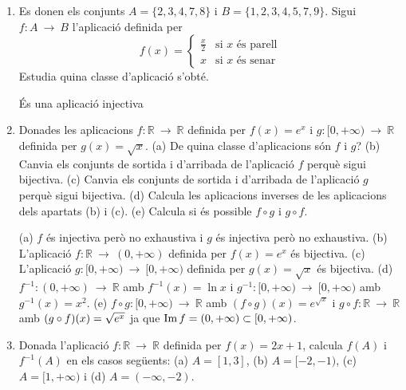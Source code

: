 \begin{enumerate}
\item
\begin{exercici}
Es donen els conjunts $A=\{2,3,4,7,8\}$ i $B=\{1,2,3,4,5,7,9\}$. Sigui
$f:A~\longrightarrow ~B$ l'aplicació definida per
\begin{equation*}
f(x)=\left\{
\begin{array}{ll}
\frac{x}{2} & \text{si \ }x\text{ \ és parell} \\
x & \text{si \ }x\text{ \ és senar}%
\end{array}%
\right.
\end{equation*}%
Estudia quina classe d'aplicació s'obté.
\end{exercici}

\begin{indicacio}
És una aplicació injectiva
\end{indicacio}

\item
\begin{exercici}
Donades les aplicacions $f:\mathbb{R}~\longrightarrow ~\mathbb{R}$
definida per $f(x)=e^{x}$ i $g:[0,+\infty )~\longrightarrow ~\mathbb{R}$
definida per $g(x)=\sqrt{x}$. (a) De quina classe d'aplicacions són $f$
i $g$? (b) Canvia els conjunts de sortida i d'arribada de l'aplicació $f$
perquè sigui bijectiva. (c) Canvia els conjunts de sortida i d'arribada
de l'aplicació $g$ perquè sigui bijectiva. (d) Calcula les
aplicacions inverses de les aplicacions dels apartats (b) i (c). (e) Calcula si
és possible $f\circ g$ i $g\circ f$.
\end{exercici}

\begin{indicacio}
(a) $f$ és injectiva però no exhaustiva i $g$ és
injectiva però no exhaustiva. (b) L'aplicació $f:\mathbb{R}%
~\longrightarrow ~(0,+\infty )$ definida per $f(x)=e^{x}$ és bijectiva.
(c) L'aplicació $g:[0,+\infty )~\longrightarrow ~[0,+\infty )$ definida
per $g(x)=\sqrt{x}$ és bijectiva. (d) $f^{-1}:(0,+\infty
)~\longrightarrow ~\mathbb{R}$ amb $f^{-1}(x)=\ln x$ i $g^{-1}:[0,+\infty
)~\longrightarrow ~[0,+\infty )$ amb $g^{-1}(x)=x^{2}$. (e) $f\circ
g:[0,+\infty )~\longrightarrow ~\mathbb{R}$ amb $(f\circ g)(x)=e^{\sqrt{x}}$
i $g\circ f:\mathbb{R}~\longrightarrow ~\mathbb{R}$ amb $(g\circ f)(x)=\sqrt{%
e^{x}}$ ja que $\operatorname{Im}f=(0,+\infty )\subset [ 0,+\infty )$.
\end{indicacio}

\item
\begin{exercici}
Donada l'aplicació $f:\mathbb{R}~\longrightarrow ~\mathbb{R}$
definida per $f(x)=2x+1$, calcula $f(A)$ i $f^{-1}(A)$ en els casos següents: (a) $A=[1,3]$, (b) $A=[-2,-1)$, (c) $A=[1,+\infty )$ i (d) $A=(-\infty
,-2)$.
\end{exercici}


\end{enumerate}
